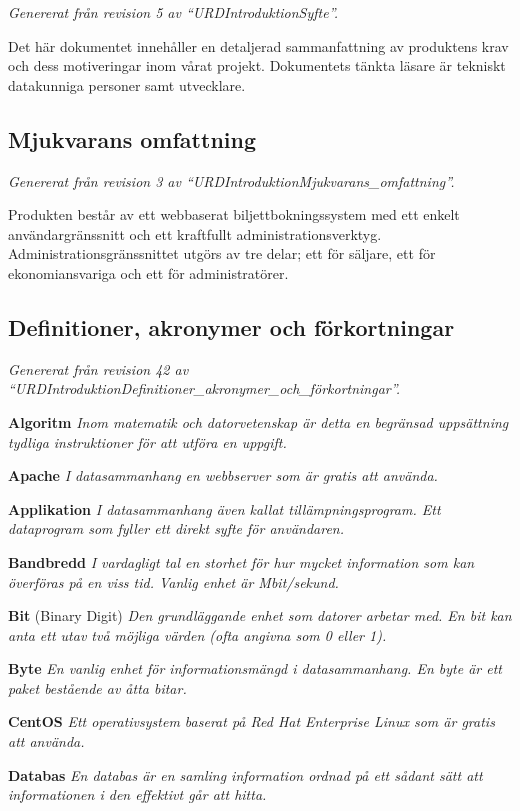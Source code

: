 \documentclass[a4paper, twoside, 11pt, titlepage]{article}
\begin{document}
	\emph{Genererat från revision 5 av ``URDIntroduktionSyfte''.}

	Det här dokumentet innehåller en detaljerad sammanfattning av produktens krav och dess motiveringar inom vårat projekt. Dokumentets tänkta läsare är tekniskt datakunniga personer samt utvecklare.

	\subsection{Mjukvarans omfattning}


	\emph{Genererat från revision 3 av ``URDIntroduktionMjukvarans\_omfattning''.}

	Produkten består av ett webbaserat biljettbokningssystem med ett enkelt användargränssnitt och ett kraftfullt administrationsverktyg. Administrationsgränssnittet utgörs av tre delar; ett för säljare, ett för ekonomiansvariga och ett för administratörer.

	\subsection{Definitioner, akronymer och förkortningar}


	\emph{Genererat från revision 42 av ``URDIntroduktionDefinitioner\_akronymer\_och\_förkortningar''.}

	\textbf{Algoritm} \emph{Inom matematik och datorvetenskap är detta en begränsad uppsättning tydliga instruktioner för att utföra en uppgift.}

	\textbf{Apache} \emph{I datasammanhang en webbserver som är gratis att använda.}

	\textbf{Applikation} \emph{I datasammanhang även kallat tillämpningsprogram. Ett dataprogram som fyller ett direkt syfte för användaren.}

	\textbf{Bandbredd} \emph{I vardagligt tal en storhet för hur mycket information som kan överföras på en viss tid. Vanlig enhet är Mbit/sekund.}

	\textbf{Bit} (Binary Digit) \emph{Den grundläggande enhet som datorer arbetar med. En bit kan anta ett utav två möjliga värden (ofta angivna som 0 eller 1).}

	\textbf{Byte} \emph{En vanlig enhet för informationsmängd i datasammanhang. En byte är ett paket bestående av åtta bitar.}

	\textbf{CentOS} \emph{Ett operativsystem baserat på Red Hat Enterprise Linux som är gratis att använda.}

	\textbf{Databas} \emph{En databas är en samling information ordnad på ett sådant sätt att informationen i den effektivt går att hitta.}
\end{document}
